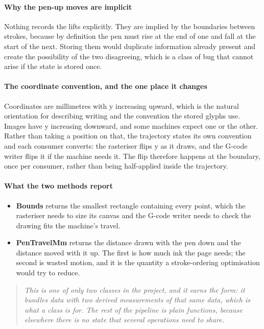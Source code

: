 \paragraph{Why the pen-up moves are implicit}
Nothing records the lifts explicitly. They are implied by the boundaries between strokes, because by definition the pen must rise at the end of one and fall at the start of the next. Storing them would duplicate information already present and create the possibility of the two disagreeing, which is a class of bug that cannot arise if the state is stored once.


\paragraph{The coordinate convention, and the one place it changes}
Coordinates are millimetres with y increasing upward, which is the natural orientation for describing writing and the convention the stored glyphs use. Images have y increasing downward, and some machines expect one or the other. Rather than taking a position on that, the trajectory states its own convention and each consumer converts: the rasteriser flips y as it draws, and the G-code writer flips it if the machine needs it. The flip therefore happens at the boundary, once per consumer, rather than being half-applied inside the trajectory.


\paragraph{What the two methods report}

\begin{itemize}\setlength\itemsep{0pt}
  \item \textbf{Bounds} returns the smallest rectangle containing every point, which the rasteriser needs to size its canvas and the G-code writer needs to check the drawing fits the machine's travel.
  \item \textbf{PenTravelMm} returns the distance drawn with the pen down and the distance moved with it up. The first is how much ink the page needs; the second is wasted motion, and it is the quantity a stroke-ordering optimisation would try to reduce.
\end{itemize}

\begin{quote}\small\itshape This is one of only two classes in the project, and it earns the form: it bundles data with two derived measurements of that same data, which is what a class is for. The rest of the pipeline is plain functions, because elsewhere there is no state that several operations need to share.\end{quote}

